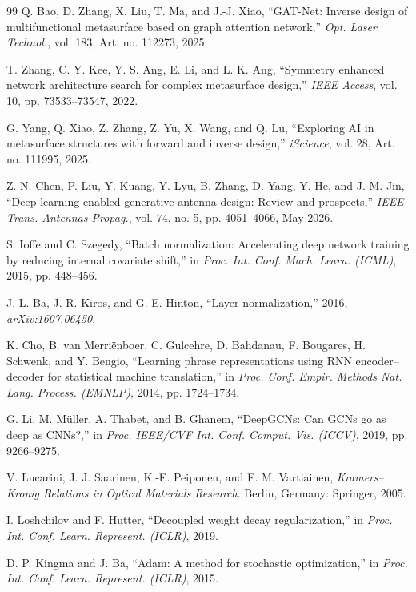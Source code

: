 \documentclass[journal]{IEEEtran}
\begin{document}
\begin{thebibliography}{99}
 Q. Bao, D. Zhang, X. Liu, T. Ma, and J.-J. Xiao, ``GAT-Net: Inverse design of multifunctional metasurface based on graph attention network,'' \textit{Opt. Laser Technol.}, vol. 183, Art. no. 112273, 2025.

 T. Zhang, C. Y. Kee, Y. S. Ang, E. Li, and L. K. Ang, ``Symmetry enhanced network architecture search for complex metasurface design,'' \textit{IEEE Access}, vol. 10, pp. 73533--73547, 2022.

 G. Yang, Q. Xiao, Z. Zhang, Z. Yu, X. Wang, and Q. Lu, ``Exploring AI in metasurface structures with forward and inverse design,'' \textit{iScience}, vol. 28, Art. no. 111995, 2025.

 Z. N. Chen, P. Liu, Y. Kuang, Y. Lyu, B. Zhang, D. Yang, Y. He, and J.-M. Jin, ``Deep learning-enabled generative antenna design: Review and prospects,'' \textit{IEEE Trans. Antennas Propag.}, vol. 74, no. 5, pp. 4051--4066, May 2026.

 S. Ioffe and C. Szegedy, ``Batch normalization: Accelerating deep network training by reducing internal covariate shift,'' in \textit{Proc. Int. Conf. Mach. Learn. (ICML)}, 2015, pp. 448--456.

 J. L. Ba, J. R. Kiros, and G. E. Hinton, ``Layer normalization,'' 2016, \textit{arXiv:1607.06450}.

 K. Cho, B. van Merri\"{e}nboer, C. Gulcehre, D. Bahdanau, F. Bougares, H. Schwenk, and Y. Bengio, ``Learning phrase representations using RNN encoder--decoder for statistical machine translation,'' in \textit{Proc. Conf. Empir. Methods Nat. Lang. Process. (EMNLP)}, 2014, pp. 1724--1734.

 G. Li, M. M\"{u}ller, A. Thabet, and B. Ghanem, ``DeepGCNs: Can GCNs go as deep as CNNs?,'' in \textit{Proc. IEEE/CVF Int. Conf. Comput. Vis. (ICCV)}, 2019, pp. 9266--9275.

 V. Lucarini, J. J. Saarinen, K.-E. Peiponen, and E. M. Vartiainen, \textit{Kramers--Kronig Relations in Optical Materials Research}. Berlin, Germany: Springer, 2005.

 I. Loshchilov and F. Hutter, ``Decoupled weight decay regularization,'' in \textit{Proc. Int. Conf. Learn. Represent. (ICLR)}, 2019.

 D. P. Kingma and J. Ba, ``Adam: A method for stochastic optimization,'' in \textit{Proc. Int. Conf. Learn. Represent. (ICLR)}, 2015.


\end{thebibliography}
\end{document}
